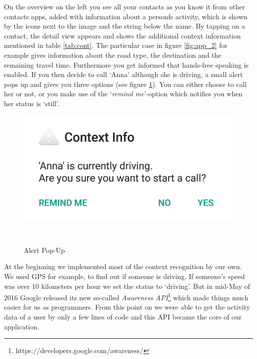 \documentclass{sigchi}
\begin{document}
On the overview on the left you see all your contacts as you know it from other contacts apps, added with information about a personfs activity, which is shown by the icons next to the image and the string below the name. By tapping on a contact, the detail view appears and shows the additional context information mentioned in table \ref{tab:cont}. The particular case in figure \ref{fig:app_2} for example gives information about the road type, the destination and the remaining travel time. Furthermore you get informed that hands-free speaking is enabled. If you then decide to call `Anna' although she is driving, a small alert pops up and gives you three options (see figure \ref{fig:app_3}). You can either choose to call her or not, or you make use of the `\textit{remind me}'-option which notifies you when her status is `still'.
\begin{figure}[H]
  \centering
  \includegraphics[width=.55\columnwidth]{figures/app_3}
  \caption{Alert Pop-Up}~\label{fig:app_3}
\end{figure}
At the beginning we implemented most of the context recognition by our own. We used GPS for example, to find out if someone is driving. If someone's speed was over 10 kilometers per hour we set the status to `driving'. But in mid-May of 2016 Google released its new so-called \textit{Awareness API}\footnote{https://developers.google.com/awareness/} which made things much easier for us as programmers. From this point on we were able to get the activity data of a user by only a few lines of code and this API became the core of our application.
\end{document}
